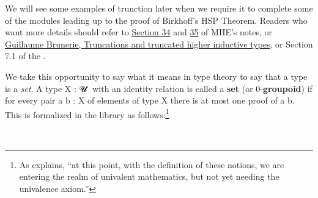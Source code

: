 We will see some examples of trunction later when we require it to complete some of the \ualib modules leading up to the proof of Birkhoff's HSP Theorem. Readers who want more details should refer to \href{https://www.cs.bham.ac.uk/~mhe/HoTT-UF-in-Agda-Lecture-Notes/HoTT-UF-Agda.html\#truncation}{Section 34} and \href{https://www.cs.bham.ac.uk/~mhe/HoTT-UF-in-Agda-Lecture-Notes/HoTT-UF-Agda.html\#resizing}{35} of MHE's notes, or \href{https://homotopytypetheory.org/2012/09/16/truncations-and-truncated-higher-inductive-types/}{Guillaume Brunerie, Truncations and truncated higher inductive types}, or Section 7.1 of the \hottbook.

We take this opportunity to say what it means in type theory to say that a type is a \emph{set}. A type \ab X : \ab 𝓤 ̇ with an identity relation  is called a \textbf{set} (or 0-\textbf{groupoid}) if for every pair \ab a \ab b : \ab X of elements of type \ab X there is at most one proof of \ab a  \ab b. This is formalized in the \TypeTopology library as follows:\footnote{As \mhe explains, ``at this point, with the definition of these notions, we are entering the realm of univalent mathematics, but not yet needing the univalence axiom.''}
\ccpad
\begin{code}
\>[0]\AgdaSpace{}%
\AgdaSymbol{:}\AgdaSpace{}%
\AgdaSpace{}%
\AgdaSpace{}%
\AgdaSpace{}%
\AgdaSpace{}%
\<%
\\
\>[0]\AgdaSpace{}%
\AgdaSpace{}%
\AgdaSymbol{=}\AgdaSpace{}%
\AgdaSymbol{(}\AgdaSpace{}%
\AgdaSpace{}%
\AgdaSymbol{:}\AgdaSpace{}%
\AgdaSymbol{)}\AgdaSpace{}%
\AgdaSpace{}%
\AgdaSpace{}%
\AgdaSymbol{(}\AgdaSpace{}%
\AgdaSpace{}%
\AgdaSymbol{)}\<%
\end{code}








